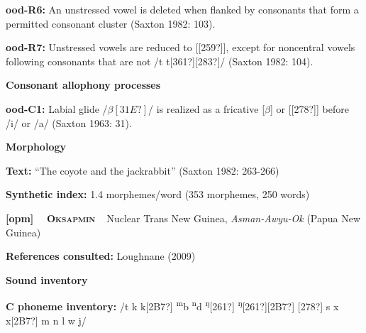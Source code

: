 \begin{styleBody}
\textbf{ood-R6:} An unstressed vowel is deleted when flanked by consonants that form a permitted consonant cluster (Saxton 1982: 103).
\end{styleBody}

\begin{styleBody}
\textbf{ood-R7:} Unstressed vowels are reduced to [[259?]], except for noncentral vowels following consonants that are not /t t[361?][283?]/ (Saxton 1982: 104).
\end{styleBody}

\begin{styleBody}
\textbf{Consonant allophony processes}
\end{styleBody}

\begin{styleBody}
\textbf{ood-C1:} Labial glide /$\beta [31E?]$/ is realized as a fricative [$\beta $] or [[278?]] before /i/ or /a/ (Saxton 1963: 31).
\end{styleBody}

\begin{styleBody}
\textbf{Morphology}
\end{styleBody}

\begin{styleBody}
\textbf{Text: }“The coyote and the jackrabbit” (Saxton 1982: 263-266)
\end{styleBody}

\begin{styleBody}
\textbf{Synthetic index: }1.4 morphemes/word (353 morphemes, 250 words)
\end{styleBody}

\clearpage\begin{styleBody}
\textbf{[opm] }\ \ \textbf{\textsc{Oksapmin}}\textbf{\ \ }Nuclear Trans New Guinea, \textit{Asman-Awyu-Ok} (Papua New Guinea)
\end{styleBody}

\begin{styleBody}
\textbf{References consulted: }Loughnane (2009)
\end{styleBody}

\begin{styleBody}
\textbf{Sound inventory}
\end{styleBody}

\begin{styleBody}
\textbf{C phoneme inventory:} /t k k[2B7?] \textsuperscript{m}b \textsuperscript{n}d \textsuperscript{ŋ}[261?] \textsuperscript{ŋ}[261?][2B7?] [278?] s x x[2B7?] m n l w j/
\end{styleBody}


